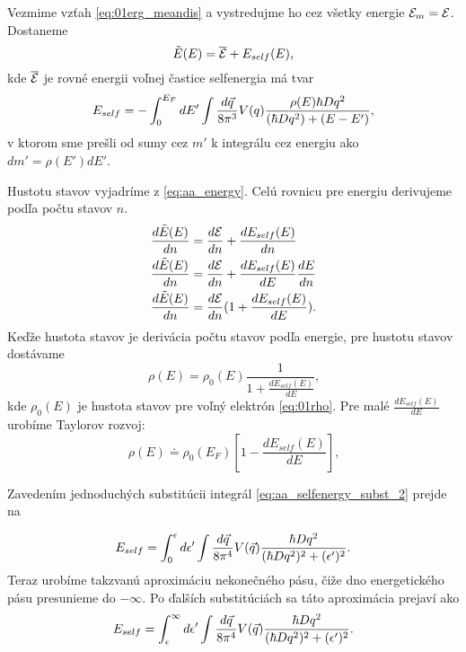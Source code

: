 Vezmime vzťah \eqref{eq:01erg_meandis} a vystredujme ho cez všetky energie $\mathcal{E}_m = \mathcal{E}$. Dostaneme
\begin{equation}
 \label{eq:aa_energy}
 \tilde E(E)=\overline{\mathcal{E}}+E_{self}(E)\text{,}
\end{equation}
kde $\overline{\mathcal{E}}$ je rovné energii voľnej častice selfenergia má tvar
\begin{equation}
 \label{eq:aa_self_energy}
 E_{self}=-\int_{0}^{E_F}dE' \int \frac{d\vec{q}}{8\pi^3}V(q)\frac{\rho(E)\hbar D q^2}{(\hbar D q^2)+(E-E')}\text{,}
\end{equation}
v ktorom sme prešli od sumy cez $m'$ k integrálu cez energiu ako $dm'=\rho(E')dE'$.

Hustotu stavov vyjadríme z \eqref{eq:aa_energy}. Celú rovnicu pre energiu derivujeme podľa počtu stavov $n$.
\begin{align}
  \frac{d\tilde E(E)}{dn}&=\frac{d\mathcal{E}}{dn}+\frac{dE_{self}(E)}{dn}\\ \notag
  \frac{d\tilde E(E)}{dn}&=\frac{d\mathcal{E}}{dn}+\frac{dE_{self}(E)}{dE}\frac{dE}{dn}\\ \notag
  \label{eq:aa_dos_invert}
  \frac{d\tilde E(E)}{dn}&=\frac{d\mathcal{E}}{dn}(1+\frac{dE_{self}(E)}{dE}) \text{.}
\end{align}
Keďže hustota stavov je derivácia počtu stavov podľa energie, pre hustotu stavov dostávame
\begin{equation}
 \label{eq:aa_dos1}
 \rho(E)=\rho_0(E)\frac{1}{1+\frac{dE_{self}(E)}{dE}} \text{,}
 \end{equation}
 kde $\rho_0(E)$ je hustota stavov pre voľný elektrón \eqref{eq:01rho}.
 Pre malé $\frac{dE_{self}(E)}{dE}$ urobíme Taylorov rozvoj:
\begin{equation}
 \label{eq:aa_dos2}
 \rho(E)\doteq\rho_0(E_F)[1-\frac{dE_{self}(E)}{dE}]\text{,}
\end{equation}



Zavedením jednoduchých substitúcii integrál \eqref{eq:aa_selfenergy_subst_2} prejde na

\begin{equation}
\label{eq:aa_selfenergy_subst_2}
E_{self}=\int_{0}^{\epsilon}d\epsilon' \int \frac{d\vec{q}}{8\pi^4}V(\vec{q})\frac{\hbar D q^2}{(\hbar Dq^2)^2+(\epsilon')^2}\text{.}
\end{equation}
Teraz urobíme takzvanú aproximáciu nekonečného pásu, čiže dno energetického pásu presunieme do $-\infty$.
Po ďalších substitúciách sa táto aproximácia prejaví ako
\begin{equation}
\label{eq:aa_selfenergy_infinite}
E_{self}=\int_{\epsilon}^{\infty}d\epsilon' \int \frac{d\vec{q}}{8\pi^4}V(\vec{q})\frac{\hbar D q^2}{(\hbar Dq^2)^2+(\epsilon')^2}\text{.}
\end{equation}


